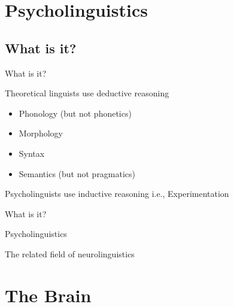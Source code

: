 \documentclass{beamer}
\subtitle[Psycholinguistics Intro]{Introduction to Psycholinguistics}
\newcommand{\suboneone}{What is it?}
\newcommand{\subtwoone}{}
\begin{document}
  

  \section{Psycholinguistics}
    \subsection{\suboneone}
      \begin{frame}{\suboneone}
        \begin{block}{Theoretical linguists use deductive reasoning}
          \begin{itemize}
            \item Phonology (but not phonetics)
            \item Morphology
            \item Syntax
            \item Semantics (but not pragmatics)
          \end{itemize}
        \end{block}
        \begin{block}{Psycholinguists use inductive reasoning}
          i.e., Experimentation
        \end{block}
      \end{frame}

      \begin{frame}{\suboneone}
        \begin{alertblock}{Psycholinguistics}
          
        \end{alertblock}
        \begin{block}{The related field of \alert{neurolinguistics}}
          
        \end{block}
      \end{frame}

  \section{The Brain}
    \subsection{\subtwoone}
      \begin{frame}{\subtwoone}
        
      \end{frame}
\end{document}
